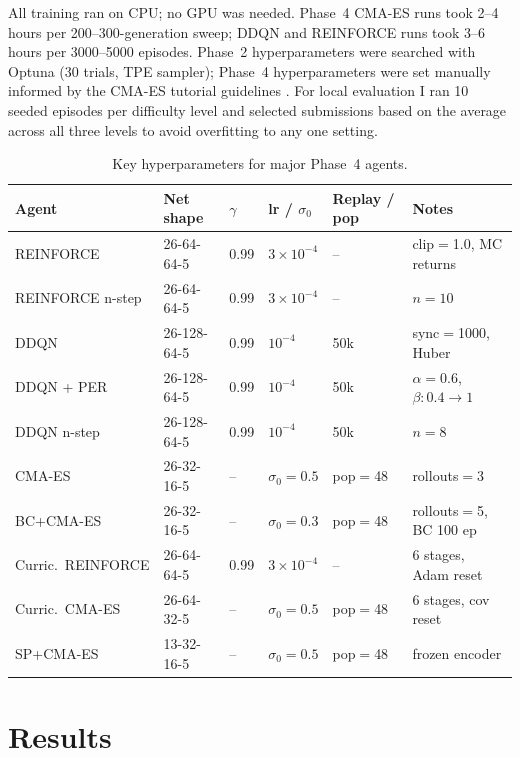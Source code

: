 \documentclass[11pt, oneside]{article}
\begin{document}
All training ran on CPU; no GPU was needed. Phase~4 CMA-ES runs took 2--4 hours per 200--300-generation sweep; DDQN and REINFORCE runs took 3--6 hours per 3000--5000 episodes. Phase~2 hyperparameters were searched with Optuna (30 trials, TPE sampler); Phase~4 hyperparameters were set manually informed by the CMA-ES tutorial guidelines \cite{hansen2016cma}. For local evaluation I ran 10 seeded episodes per difficulty level and selected submissions based on the average across all three levels to avoid overfitting to any one setting.

\begin{table}[H]\centering\small
\caption{Key hyperparameters for major Phase~4 agents.}
\begin{tabular}{llllll}
\toprule
Agent & Net shape & $\gamma$ & lr / $\sigma_0$ & Replay / pop & Notes \\
\midrule
REINFORCE & 26-64-64-5 & 0.99 & $3\times10^{-4}$ & -- & clip$=$1.0, MC returns \\
REINFORCE n-step & 26-64-64-5 & 0.99 & $3\times10^{-4}$ & -- & $n=10$ \\
DDQN & 26-128-64-5 & 0.99 & $10^{-4}$ & 50k & sync$=$1000, Huber \\
DDQN + PER & 26-128-64-5 & 0.99 & $10^{-4}$ & 50k & $\alpha=0.6$, $\beta{:}0.4{\to}1$ \\
DDQN n-step & 26-128-64-5 & 0.99 & $10^{-4}$ & 50k & $n=8$ \\
CMA-ES & 26-32-16-5 & -- & $\sigma_0=0.5$ & pop$=$48 & rollouts$=$3 \\
BC+CMA-ES & 26-32-16-5 & -- & $\sigma_0=0.3$ & pop$=$48 & rollouts$=$5, BC 100 ep \\
Curric.\ REINFORCE & 26-64-64-5 & 0.99 & $3\times10^{-4}$ & -- & 6 stages, Adam reset \\
Curric.\ CMA-ES & 26-64-32-5 & -- & $\sigma_0=0.5$ & pop$=$48 & 6 stages, cov reset \\
SP+CMA-ES & 13-32-16-5 & -- & $\sigma_0=0.5$ & pop$=$48 & frozen encoder \\
\bottomrule
\end{tabular}
\end{table}

\section{Results}
\end{document}
